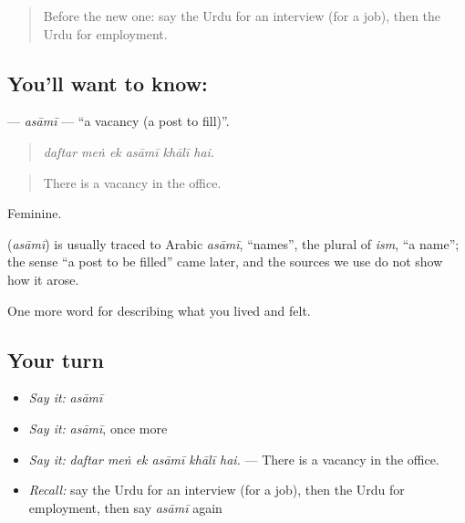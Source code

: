 \label{lesson:UR-C494-asami}



\begin{quote}
Before the new one: say the Urdu for an interview (for a job), then the Urdu for employment.
\end{quote}

\subsection*{You'll want to know: }
\textbf{} — \emph{asāmī} — \textquotedblleft{}a vacancy (a post to fill)\textquotedblright{}.

\begin{quote}
     
\end{quote}

\begin{quote}
\emph{daftar meṅ ek asāmī khālī hai.}
\end{quote}

\begin{quote}
There is a vacancy in the office.
\end{quote}

Feminine.

\begin{cousinweb}
\textbf{} (\emph{asāmī}) is usually traced to Arabic \emph{asāmī}, \textquotedblleft{}names\textquotedblright{}, the plural of \emph{ism}, \textquotedblleft{}a name\textquotedblright{}; the sense \textquotedblleft{}a post to be filled\textquotedblright{} came later, and the sources we use do not show how it arose.
\end{cousinweb}

\begin{grammarlens}[title={What you've built}]
One more word for describing what you lived and felt.
\end{grammarlens}

\subsection*{Your turn}
\begin{itemize}
\raggedright
  \item \emph{Say it:} \emph{asāmī}
  \item \emph{Say it:} \emph{asāmī}, once more
  \item \emph{Say it:} \emph{daftar meṅ ek asāmī khālī hai.} — There is a vacancy in the office.
  \item \emph{Recall:} say the Urdu for an interview (for a job), then the Urdu for employment, then say \emph{asāmī} again
\end{itemize}

